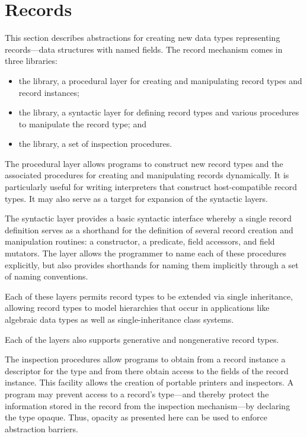 \chapter{Records}
\label{recordschapter}
This section describes abstractions for creating new data types
representing records---data structures with named fields. The record
mechanism comes in three libraries:

\begin{itemize}
\item the  library,
  a procedural layer for creating and manipulating record types and record
  instances;
\item the  library,
  a syntactic layer for defining record types and
  various procedures to manipulate the record
  type; and
\item the  library,
  a set of inspection procedures.
\end{itemize}
% 
The procedural layer allows programs to construct new record types
and the associated procedures for creating and manipulating records
dynamically.
It is particularly useful for writing interpreters that construct
host-compatible record types.  It may also serve as a target for expansion
of the syntactic layers.

The syntactic layer provides a basic syntactic interface
whereby a single record definition serves as a shorthand for the definition of
several record creation and manipulation routines: a constructor, a
predicate, field accessors, and field mutators.  The
layer allows the programmer to name each of these
procedures explicitly, but also provides shorthands for naming them
implicitly through a set of naming conventions.

Each of these layers permits record types to be extended via single
inheritance, allowing record types to model hierarchies that occur in
applications like algebraic data types as well as single-inheritance class
systems.

Each of the layers also supports generative and nongenerative record types.

The inspection procedures allow programs to obtain from a record instance a
descriptor for the type and from there obtain access to the fields of the
record instance. This facility allows the creation of portable printers and inspectors.
A program may prevent access to a record's type---and thereby protect the
information stored in the record from the inspection mechanism---by declaring the
type opaque. Thus, opacity as presented here can be used to enforce abstraction
barriers.

